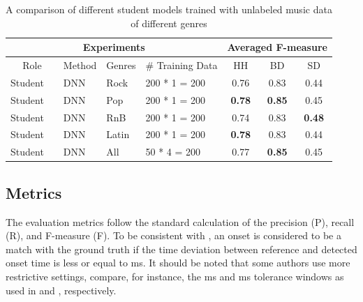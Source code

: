 \documentclass{article}
\begin{document}
\begin{table}
\centering
\begin{tabular*}{\textwidth}{l@{\extracolsep{\fill}}llllccc}
\hline
\multicolumn{5}{c}{Experiments}                               & \multicolumn{3}{c}{Averaged F-measure}           \\ \hline
\multicolumn{2}{c}{Role} & Method & Genres & \# Training Data & HH             & BD             & SD             \\ \hline
Student    &             & DNN    & Rock   & 200 * 1 = 200    & 0.76          & 0.83          & 0.44          \\
Student    &             & DNN    & Pop    & 200 * 1 = 200    & \textbf{0.78} & \textbf{0.85} & 0.45          \\
Student    &             & DNN    & RnB    & 200 * 1 = 200    & 0.74          & 0.83          & \textbf{0.48} \\
Student    &             & DNN    & Latin  & 200 * 1 = 200    & \textbf{0.78} & 0.83          & 0.44          \\
Student    &             & DNN    & All     & 50 * 4 = 200     & 0.77          & \textbf{0.85}          & 0.45          \\ \hline
\end{tabular*}
\caption{A comparison of different student models trained with unlabeled music data of different genres}%
\label{tab:genre_results}
\end{table}


\subsection{Metrics}
The evaluation metrics follow the standard calculation of the precision (P), recall (R), and F-measure (F). To be consistent with \cite{Gillet2008, Wu2015a, Southall2016}, an onset is considered to be a match with the ground truth if the time deviation between reference and detected onset time is less or equal to \unit[50]{ms}. It should be noted that some authors use more restrictive settings, compare, for instance, the \unit[30]{ms} and \unit[20]{ms} tolerance windows as used in \cite{Paulus2009a} and \cite{Vogl2017}, respectively.  
\end{document}
